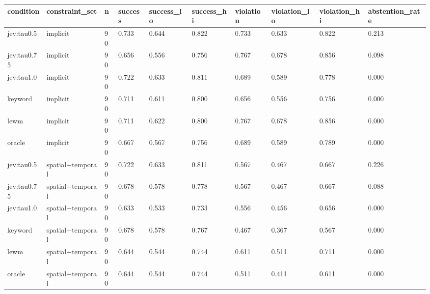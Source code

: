 \begin{tabular}{llllllllll}
\toprule
condition & constraint\_set & n & success & success\_lo & success\_hi & violation & violation\_lo & violation\_hi & abstention\_rate \\
\midrule
jev:tau0.5 & implicit & 90 & 0.733 & 0.644 & 0.822 & 0.733 & 0.633 & 0.822 & 0.213 \\
jev:tau0.75 & implicit & 90 & 0.656 & 0.556 & 0.756 & 0.767 & 0.678 & 0.856 & 0.098 \\
jev:tau1.0 & implicit & 90 & 0.722 & 0.633 & 0.811 & 0.689 & 0.589 & 0.778 & 0.000 \\
keyword & implicit & 90 & 0.711 & 0.611 & 0.800 & 0.656 & 0.556 & 0.756 & 0.000 \\
lewm & implicit & 90 & 0.711 & 0.622 & 0.800 & 0.767 & 0.678 & 0.856 & 0.000 \\
oracle & implicit & 90 & 0.667 & 0.567 & 0.756 & 0.689 & 0.589 & 0.789 & 0.000 \\
jev:tau0.5 & spatial+temporal & 90 & 0.722 & 0.633 & 0.811 & 0.567 & 0.467 & 0.667 & 0.226 \\
jev:tau0.75 & spatial+temporal & 90 & 0.678 & 0.578 & 0.778 & 0.567 & 0.467 & 0.667 & 0.088 \\
jev:tau1.0 & spatial+temporal & 90 & 0.633 & 0.533 & 0.733 & 0.556 & 0.456 & 0.656 & 0.000 \\
keyword & spatial+temporal & 90 & 0.678 & 0.578 & 0.767 & 0.467 & 0.367 & 0.567 & 0.000 \\
lewm & spatial+temporal & 90 & 0.644 & 0.544 & 0.744 & 0.611 & 0.511 & 0.711 & 0.000 \\
oracle & spatial+temporal & 90 & 0.644 & 0.544 & 0.744 & 0.511 & 0.411 & 0.611 & 0.000 \\
\bottomrule
\end{tabular}